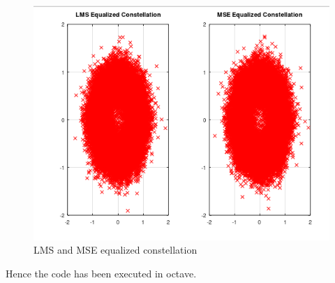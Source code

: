 \begin{figure}[!ht]
\centering
\includegraphics[width=\columnwidth]{./figs/lms.PNG}
\caption{LMS and MSE equalized constellation}
\label{fig:lms_mse}
\end{figure}
Hence the code has been executed in octave.
